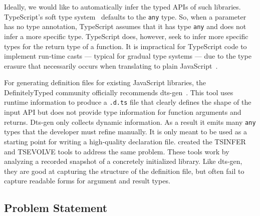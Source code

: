 \documentclass[sigplan,10pt,review,anonymous]{acmart} %
\newcommand{\margincomment}[2]{\marginpar{\scriptsize\color{Maroon}#1 says: #2}}
\newcommand{\adg}[1]{\margincomment{ADG}{#1}}
\theoremstyle{plain}
\theoremstyle{remark}
\theoremstyle{definition}
\begin{document}
Ideally, we would like to automatically infer the typed APIs of such
libraries.
TypeScript's soft type system~\citep{softtyping}
defaults to the \texttt{any} type.
So, when a parameter has no type annotation, TypeScript assumes that it has type
\texttt{any} and does not infer a more specific type.
%
TypeScript does, however, seek to infer more specific types for the return type of a function.
%
It is impractical for TypeScript code to implement run-time casts --- typical for gradual type
systems --- due to the type erasure that necessarily occurs when translating to plain JavaScript~\citep{understandtypescript}.

%
For generating definition files for existing JavaScript libraries,
the DefinitelyTyped
community officially recommends dts-gen~\citep{dtsgen}.
This tool uses runtime information to produce a \lstinline{.d.ts} file that 
clearly defines the shape of the input API but does not provide type information for
function arguments and returns.
Dts-gen only collects
dynamic information. As a result it emits many \texttt{any} types that the developer must refine manually.
It is only meant to be used as a starting
point for writing a high-quality declaration file. 
\citet{tstools2017} created the TSINFER and TSEVOLVE tools to address the same problem.
These tools work by analyzing a recorded snapshot of a concretely initialized library.
Like dts-gen, they are good at capturing the structure of the definition file,
but often fail to capture readable forms for argument and result types.

\subsection{Problem Statement}\label{ssec:problem}
% 

\end{document}
